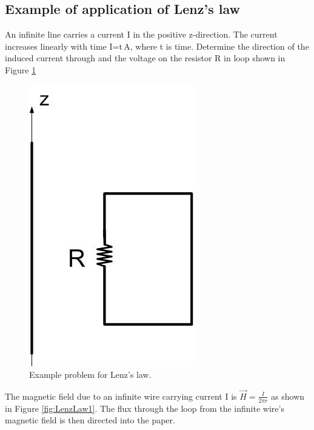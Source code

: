 \documentclass{ximera}
\begin{document}
\begin{example}
\section{Example of application of Lenz's law}

An infinite line carries a current I in the positive z-direction. The current increases linearly with time I=t\,A, where t is time. Determine the direction of the induced current through and the voltage on the resistor R in loop shown in Figure \ref{fig:LenzLaw}


\begin{figure}[htbp]
\begin{center}
\includegraphics[scale=0.5]{../jpg/Lenzlaw.jpg}
\end{center}
\caption{Example problem for Lenz's law.}
\label{fig:LenzLaw}
\end{figure}


\begin{explanation}

The magnetic field due to an infinite wire carrying current I is $\vec{H}=\frac{I}{2 \pi r}$ as shown in Figure \ref{fig:LenzLaw1}.  The flux through the loop from the infinite wire's magnetic field is then directed into the paper.




\end{explanation}
\end{example}
\end{document}
